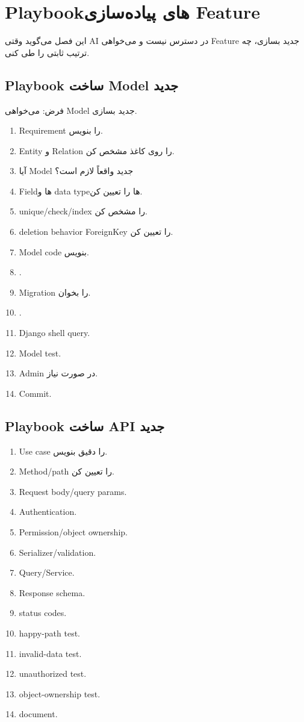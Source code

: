 
\chapter{Playbookهای پیاده‌سازی Feature}

این فصل می‌گوید وقتی AI در دسترس نیست و می‌خواهی Feature جدید بسازی، چه ترتیب ثابتی را طی کنی.

\section{Playbook ساخت Model جدید}

فرض: می‌خواهی Model جدید بسازی.

\begin{enumerate}
  \item Requirement را بنویس.
  \item Entity و Relation را روی کاغذ مشخص کن.
  \item آیا Model جدید واقعاً لازم است؟
  \item Fieldها و data typeها را تعیین کن.
  \item unique/check/index را مشخص کن.
  \item deletion behavior ForeignKey را تعیین کن.
  \item Model code بنویس.
  \item {}.
  \item Migration را بخوان.
  \item {}.
  \item Django shell query.
  \item Model test.
  \item Admin در صورت نیاز.
  \item Commit.
\end{enumerate}

\section{Playbook ساخت API جدید}

\begin{enumerate}
  \item Use case را دقیق بنویس.
  \item Method/path را تعیین کن.
  \item Request body/query params.
  \item Authentication.
  \item Permission/object ownership.
  \item Serializer/validation.
  \item Query/Service.
  \item Response schema.
  \item status codes.
  \item happy-path test.
  \item invalid-data test.
  \item unauthorized test.
  \item object-ownership test.
  \item document.
\end{enumerate}

